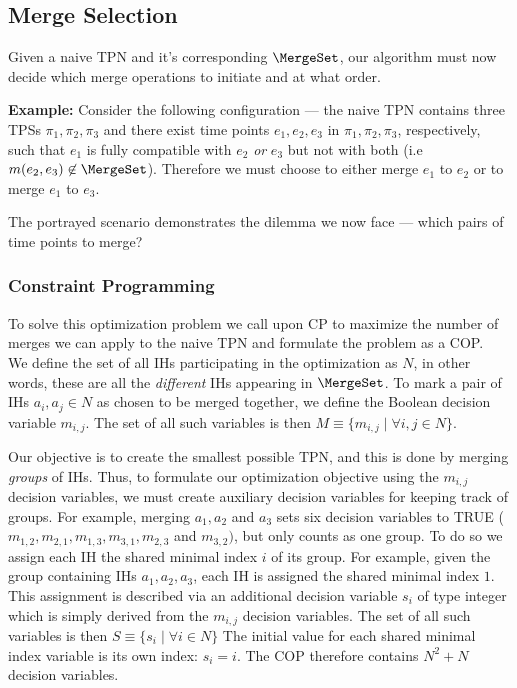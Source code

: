\subsection{Merge Selection}
\label{generating: merge selection}
Given a naive TPN and it's corresponding $\MergeSet$, our algorithm must now decide which 
merge operations to initiate and at what order. 

\begin{tcolorbox}[colback=blue!5!white,colframe=blue!75!black]
     \textbf{Example:} Consider the following configuration --- the naive TPN contains three
     TPSs $\pi_1,\pi_2,\pi_3$ and there exist time points 
     $e_1, e_2, e_3$ in $\pi_1, \pi_2, \pi_3$, respectively, such that $e_1$ is fully
     compatible with $e_2$ \textit{or} $e_3$ but not with both (i.e $m(e_2,e_3) \not \in \MergeSet$).
     Therefore we must choose to either merge $e_1$ to $e_2$ or to merge $e_1$ to $e_3$.
  \end{tcolorbox}


The portrayed scenario demonstrates the dilemma we now face --- 
which pairs of time points to merge? 


\subsubsection{Constraint Programming} To solve this optimization problem we call upon
CP to maximize the number of merges we can apply to the naive TPN and formulate the 
problem as a COP. \\ 

We define the set of all IHs participating in the optimization as $N$, in other words,
these are all the {\em different} IHs appearing in $\MergeSet$.
To mark a pair of IHs $a_i,a_j \in N$ as chosen to be merged together, 
we define the Boolean decision variable $m_{i,j}$. The set of all such variables is then
 $M \equiv \{m_{i,j} \mid \forall i,j \in N\}$.

Our objective is to create the smallest possible TPN, and this is done by merging {\em groups} of IHs. Thus, to formulate our optimization objective using the $m_{i,j}$ decision variables, we must create auxiliary decision variables for keeping track of groups. For example, merging $a_1, a_2$ and $a_3$ sets six decision variables to TRUE ($m_{1,2}, m_{2,1}, m_{1,3}, m_{3,1}, m_{2,3}$ and $m_{3,2})$, but only counts as one group.
To do so we assign each IH the shared minimal index $i$ of its group.
For example, given the group containing IHs $a_1,a_2,a_3$, each IH is assigned the shared minimal index $1$.
This assignment is described via an additional decision variable $s_i$ of type integer which is simply derived from the $m_{i,j}$ decision variables. The set of all such variables is then $S \equiv \{s_i \mid \forall i \in N\}$
The initial value for each shared minimal index variable is its own index: $s_i = i$.
The COP therefore contains $N^2 + N$ decision variables.

